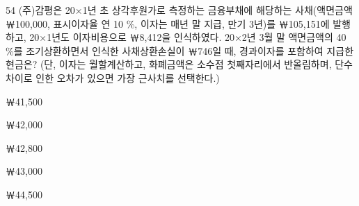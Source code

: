\begin{question}{54}
(주)감평은 20×1년 초 상각후원가로 측정하는 금융부채에 해당하는 사채(액면금액 ￦100,000, 표시이자율 연 10 \%, 이자는 매년 말 지급, 만기 3년)를 ￦105,151에 발행하고, 20×1년도 이자비용으로 ￦8,412을 인식하였다. 20×2년 3월 말 액면금액의 40 \%를 조기상환하면서 인식한 사채상환손실이 ￦746일 때, 경과이자를 포함하여 지급한 현금은? (단, 이자는 월할계산하고, 화폐금액은 소수점 첫째자리에서 반올림하며, 단수차이로 인한 오차가 있으면 가장 근사치를 선택한다.)
\begin{choices}
  \item ￦41,500
  \item ￦42,000
  \item ￦42,800
  \item ￦43,000
  \item ￦44,500
\end{choices}
\end{question}
